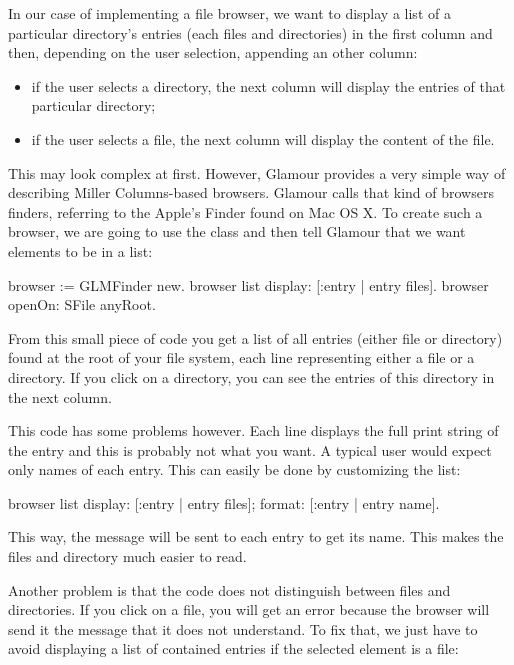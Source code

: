 \documentclass[a4paper,10pt,twoside]{book}
\begin{document}
In our case of implementing a file browser, we want to display a list
of a particular directory's entries (each files and directories) in
the first column and then, depending on the user selection, appending
an other column:

\begin{itemize}
\item if the user selects a directory, the next column will display
  the entries of that particular directory;
\item if the user selects a file, the next column will display the
  content of the file.
\end{itemize}

This may look complex at first. However, Glamour provides a very
simple way of describing Miller Columns-based browsers. Glamour calls
that kind of browsers finders, referring to the Apple's Finder found
on Mac OS X. To create such a browser, we are going to use the
 class and then tell Glamour that we want elements
to be in a list:


\begin{code}{}
browser := GLMFinder new.
browser list
	display: [:entry | entry files].
browser openOn: SFile anyRoot.
\end{code}

From this small piece of code you get a list of all entries (either
file or directory) found at the root of your file system, each line
representing either a file or a directory. If you click on a
directory, you can see the entries of this directory in the next
column.


This code has some problems however. Each line displays the full print
string of the entry and this is probably not what you want. A typical
user would expect only names of each entry. This can easily be done by
customizing the list:

\begin{code}{}
browser list
  display: [:entry | entry files];
  format: [:entry | entry name].
\end{code}

This way, the message  will be sent to each entry to get its
name. This makes the files and directory much easier to read.


Another problem is that the code does not distinguish between files
and directories. If you click on a file, you will get an error because
the browser will send it the message  that it does not
understand. To fix that, we just have to avoid displaying a list of
contained entries if the selected element is a file:
\end{document}
